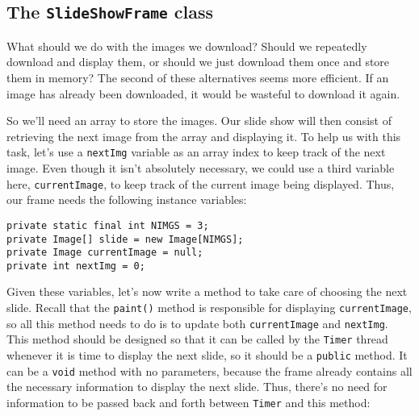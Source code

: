 
\subsection{The {\tt SlideShowFrame} class}
\noindent What should we do with the images we download? Should we repeatedly
download and display them, or should we just download them once and
store them in memory? The second of these alternatives seems more
efficient.  If an image has already been downloaded, it would be
wasteful to download it again.


So we'll need an array to store the images.  Our slide show will then
consist of retrieving the next image from the array and displaying
it.  To help us with this task, let's use a {\tt nextImg} variable as
an array index to keep track of the next image.  Even though it isn't
absolutely necessary, we could use a third variable here,
{\tt currentImage}, to keep track of the current image being
displayed.  Thus, our frame needs the following instance variables:

\begin{jjjlisting}
\begin{lstlisting}
private static final int NIMGS = 3;
private Image[] slide = new Image[NIMGS];
private Image currentImage = null;
private int nextImg = 0;
\end{lstlisting}
\end{jjjlisting}

Given these variables, let's now write a method to take care of
choosing the next slide.  Recall that the {\tt paint()} method is
responsible for displaying {\tt currentImage}, so all this method needs to
do is to update both {\tt currentImage} and {\tt nextImg}.  This
method should be designed so that it can be called by the {\tt Timer}
thread whenever it is time to display the next slide, so it should be
a {\tt public} method.   It can be a {\tt void} method with no
parameters, because the frame already contains all the necessary information
to display the next slide.  Thus, there's no need for information
to be passed back and forth between {\tt Timer} and this method:


